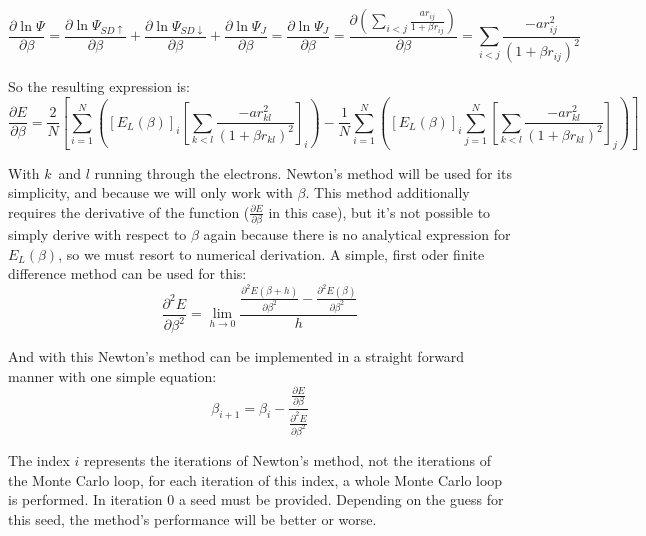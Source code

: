 		\begin{equation}\frac{\partial\ln{\Psi}}{\partial\beta}=\frac{\partial\ln{\Psi_{SD\uparrow}}}{\partial\beta}+\frac{\partial\ln{\Psi_{SD\downarrow}}}{\partial\beta}+\frac{\partial\ln{\Psi_J}}{\partial\beta}=\frac{\partial\ln{\Psi_J}}{\partial\beta}=\frac{\partial\left(\sum_{i<j}\frac{ar_{ij}}{1+\beta r_{ij}}\right)}{\partial\beta}=\sum_{i<j}\frac{-ar_{ij}^2}{\left(1+\beta r_{ij}\right)^2}\end{equation}

		So the resulting expression is:\\

		\begin{equation}\frac{\partial E}{\partial\beta}=\frac{2}{N}\left[\sum_{i=1}^N\left(\left[E_L\left(\beta\right)\right]_i\left[\sum_{k<l}\frac{-ar_{kl}^2}{\left(1+\beta r_{kl}\right)^2}\right]_i\right)-\frac{1}{N}\sum_{i=1}^N\left(\left[E_L\left(\beta\right)\right]_i\sum_{j=1}^N\left[\sum_{k<l}\frac{-ar_{kl}^2}{\left(1+\beta r_{kl}\right)^2}\right]_j\right)\right]\end{equation}

		With $k$ and $l$ running through the electrons. Newton's method will be used for its simplicity, and because we will only work with $\beta$. This method additionally requires the derivative of the function ($\frac{\partial E}{\partial\beta}$ in this case), but it's not possible to simply derive with respect to $\beta$ again because there is no analytical expression for $E_L\left(\beta\right)$, so we must resort to numerical derivation. A simple, first oder finite difference method can be used for this:\\

		\begin{equation}\frac{\partial^2 E}{\partial\beta^2}=\lim_{h\to 0}\frac{\frac{\partial^2 E\left(\beta+h\right)}{\partial\beta^2}-\frac{\partial^2 E\left(\beta\right)}{\partial\beta^2}}{h}\end{equation}

		And with this Newton's method can be implemented in a straight forward manner with one simple equation:\\

		\begin{equation}\beta_{i+1}=\beta_i-\frac{\frac{\partial E}{\partial\beta}}{\frac{\partial^2 E}{\partial\beta^2}}\end{equation}

		The index $i$ represents the iterations of Newton's method, not the iterations of the Monte Carlo loop, for each iteration of this index, a whole Monte Carlo loop is performed. In iteration $0$ a seed must be provided. Depending on the guess for this seed, the method's performance will be better or worse.\\

